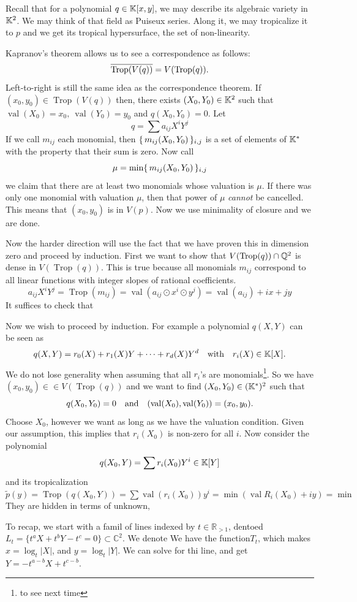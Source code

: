 \documentclass[12pt]{memoir}
\DeclareMathOperator{\val}{val}
\DeclareMathOperator{\Trop}{Trop}
\theoremstyle{definition}
\def\RR{{\mathbb R}}
\def\CC{{\mathbb C}}
\begin{document}
Recall that for a polynomial $q\in\mathbb{K}[x,y]$, we may describe its algebraic variety in $\mathbb{K}^2$. We may think of that field as Puiseux series. Along it, we may tropicalize it to $p$ and we get its tropical hypersurface, the set of non-linearity.\par
Kapranov's theorem allows us to see a correspondence as follows:
$$\ov{\Trop(V(q))}=V(\Trop(q)).$$
Left-to-right is still the same idea as the correspondence theorem. If $(x_0,y_0)\in\Trop(V(q))$ then, there exists $(X_0,Y_0)\in\mathbb{K}^2$ such that $\val(X_0)=x_0,\ \val(Y_0)=y_0$ and $q(X_0,Y_0)=0$. Let 
$$q=\sum a_{ij}X^iY^j$$
If we call $m_{ij}$ each monomial, then $\{\,m_{ij}(X_0,Y_0)\,\}_{i,j}$ is a set of elements of $\mathbb{K}^\ast$ with the property that their sum is zero. Now call 
$$\mu=\min\{\,m_{ij}(X_0,Y_0)\,\}_{i,j}$$
we claim that there are at least two monomials whose valuation is $\mu$. If there was only one monomial with valuation $\mu$, then that power of $\mu$ \emph{cannot} be cancelled. This means that $(x_0,y_0) $ is in $V(p)$. Now we use minimality of closure and we are done.\par 
Now the harder direction will use the fact that we have proven this in dimension zero and proceed by induction. First we want to show that $V(\Trop(q))\cap\bQ^2$ is dense in $V(\Trop(q))$. This is true because all monomials $m_{ij}$ correspond to all linear functions with integer slopes of rational coefficients.
$$a_{ij}X^iY^j=\Trop(m_{ij})=\val(a_{ij}\odot x^{i}\odot y^j)=\val(a_{ij})+ix+jy$$
It suffices to check that \par 
Now we wish to proceed by induction. For example a polynomial $q(X,Y)$ can be seen as 
$$q(X,Y)=r_0(X)+r_1(X)Y+\dots+r_d(X)Y^d\quad\text{with}\quad r_i(X)\in\mathbb{K}[X].$$
We do not lose generality when assuming that all $r_i$'s are monomials\footnote{to see next time}. So we have $(x_0,y_0)\in\in V(\Trop(q))$ and we want to find $(X_0,Y_0)\in(\mathbb{K}^\ast)^2$ such that 
$$q(X_0,Y_0)=0\word{and}(\val(X_0),\val(Y_0))=(x_0,y_0).$$
Choose $X_0$, however we want as long as we have the valuation condition. Given our assumption, this implies that $r_i(X_0)$ is non-zero for all $i$. Now consider the polynomial 
$$q(X_0,Y)=\sum r_i(X_0)Y^i\in\mathbb{K}[Y]$$
and its tropicalization
$\tilde{p}(y)=\Trop(q(X_0,Y))=\sum\val(r_i(X_0))y^i=\min(\val R_i(X_0)+iy)=\min$
They are hidden in terms of unknown,




To recap, we start with a famil of lines indexed by $t \in \RR_{>1}$, dentoed $L_t= \{t^aX + t^bY -t^c=0\} \subset \CC^2$. We denote We have the function$ T_t$, which makes $x= \log_t|X|$, and $y=\log_t|Y|$. We can solve for thi line, and get $Y= -t^{a-b}X + t^{c-b}$.
\end{document}

